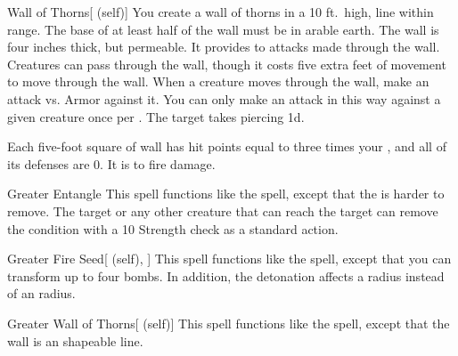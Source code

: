 \lowercase{\hypertarget{spell:Wall of Thorns}{}}\label{spell:Wall of Thorns}
\begin{attuneability}[\nth{2}]{\hypertarget{spell:Wall of Thorns}{Wall of Thorns}}[ (self)]
You create a wall of thorns in a 10 ft.\ high, \areamed line within \rngmed range.
The base of at least half of the wall must be in arable earth.
The wall is four inches thick, but permeable.
It provides  to attacks made through the wall.
Creatures can pass through the wall, though it costs five extra feet of movement to move through the wall.
When a creature moves through the wall, make an attack vs. Armor against it.
You can only make an attack in this way against a given creature once per .
\hit The target takes piercing  \minus1d.

Each five-foot square of wall has hit points equal to three times your , and all of its defenses are 0.
It is  to fire damage.
\end{attuneability}
\vspace{0.25em}



\lowercase{\hypertarget{spell:Greater Entangle}{}}\label{spell:Greater Entangle}
\begin{freeability}[\nth{4}]{\hypertarget{spell:Greater Entangle}{Greater Entangle}}
This spell functions like the  spell, except that the  is harder to remove.
The target or any other creature that can reach the target can remove the condition with a  10 Strength check as a standard action.
\end{freeability}
\vspace{0.25em}



\lowercase{\hypertarget{spell:Greater Fire Seed}{}}\label{spell:Greater Fire Seed}
\begin{attuneability}[\nth{4}]{\hypertarget{spell:Greater Fire Seed}{Greater Fire Seed}}[ (self), ]
This spell functions like the  spell, except that you can transform up to four bombs.
In addition, the detonation affects a \areamed radius instead of an \areasmall radius.
\end{attuneability}
\vspace{0.25em}



\lowercase{\hypertarget{spell:Greater Wall of Thorns}{}}\label{spell:Greater Wall of Thorns}
\begin{attuneability}[\nth{4}]{\hypertarget{spell:Greater Wall of Thorns}{Greater Wall of Thorns}}[ (self)]
This spell functions like the  spell, except that the wall is an \arealarge shapeable line.
\end{attuneability}
\vspace{0.25em}




